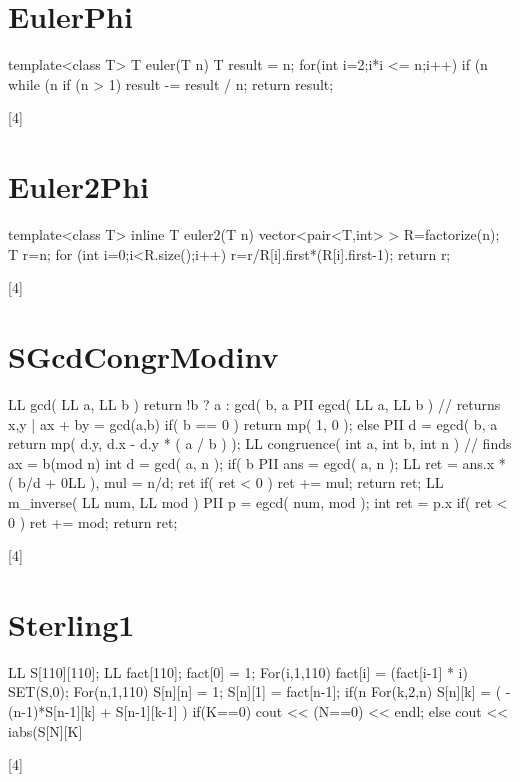 \documentclass[a4paper,9pt]{article}
\begin{document}
\section{EulerPhi}
\begin{verbatimtab}[4]
	template<class T> T euler(T n) {
		T result = n;
		for(int i=2;i*i <= n;i++) {
			if (n %
			while (n %
		}
		if (n > 1) result -= result / n;
		return result;
	}
\end{verbatimtab}[4]

\section{Euler2Phi}
\begin{verbatimtab}[4]
	template<class T> inline T euler2(T n) {
		vector<pair<T,int> > R=factorize(n);
		T r=n;
		for (int i=0;i<R.size();i++)
			r=r/R[i].first*(R[i].first-1);
		return r;
	}
\end{verbatimtab}[4]

\section{SGcdCongrModinv}
\begin{verbatimtab}[4]
	LL gcd( LL a, LL b ) {
		return !b ? a : gcd( b, a%
	}
	PII egcd( LL a, LL b ) {  // returns x,y | ax + by = gcd(a,b)
		if( b == 0 ) return mp( 1, 0 );
		else {
			PII d = egcd( b, a %
			return mp( d.y, d.x - d.y * ( a / b ) );
		}
	}
	LL congruence( int a, int b, int n ) { // finds ax = b(mod n)
		int d = gcd( a, n );
		if( b %
		PII ans = egcd( a, n );
		LL ret = ans.x * ( b/d + 0LL ), mul = n/d;
		ret %
		if( ret < 0 ) ret += mul;
		return ret;
	}
	LL m_inverse( LL num, LL mod ) {
		PII p = egcd( num, mod );
		int ret = p.x %
		if( ret < 0 ) ret += mod;
		return ret;
	}
\end{verbatimtab}[4]

\section{Sterling1}
\begin{verbatimtab}[4]
	LL S[110][110]; LL fact[110];
	fact[0] = 1; For(i,1,110) fact[i] = (fact[i-1] * i) %
	SET(S,0);
	For(n,1,110) {
		S[n][n] = 1; S[n][1] = fact[n-1];
		if(n%
		For(k,2,n) {
			S[n][k] = ( - (n-1)*S[n-1][k] + S[n-1][k-1] )%
		}
	}
	if(K==0)
		cout << (N==0) << endl;
	else
		cout << iabs(S[N][K]%
\end{verbatimtab}[4]
\end{document}
